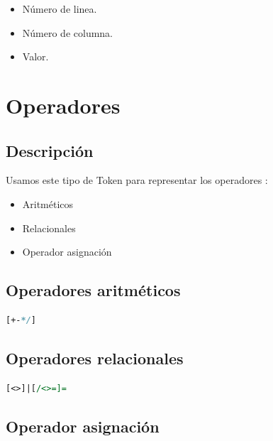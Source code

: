             \begin{itemize}
                \item Número de linea.
                \item Número de columna.
                \item Valor.
            \end{itemize}

            \hfill
            \clearpage




	\section{Operadores}

        \subsection{Descripción}
        
            Usamos este tipo de Token para representar los operadores :
            
            \begin{itemize}
            
                \item Aritméticos
                \item Relacionales
                \item Operador asignación
                
            \end{itemize}
        
        \subsection{Operadores aritméticos}
        
            \begin{lstlisting}[language=Perl]
[+-*/]
            \end{lstlisting}

        \subsection{Operadores relacionales}

            \begin{lstlisting}[language=Perl]
[<>]|[/<>=]=
            \end{lstlisting}
            
        \subsection{Operador asignación}

